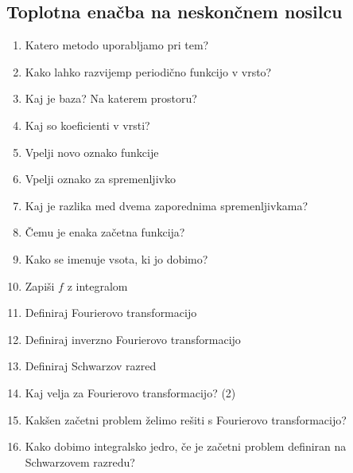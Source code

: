 \documentclass{article}
\begin{document}
    \subsection{Toplotna enačba na neskončnem nosilcu}
    \begin{enumerate}
        \item Katero metodo uporabljamo pri tem?
        \item Kako lahko razvijemp periodično funkcijo v vrsto?
        \item Kaj je baza? Na katerem prostoru?
        \item Kaj so koeficienti v vrsti?
        \item Vpelji novo oznako funkcije
        \item Vpelji oznako za spremenljivko
        \item Kaj je razlika med dvema zaporednima spremenljivkama?
        \item Čemu je enaka začetna funkcija?
        \item Kako se imenuje vsota, ki jo dobimo?
        \item Zapiši $f$ z integralom
        \item Definiraj Fourierovo transformacijo
        \item Definiraj inverzno Fourierovo transformacijo
        \item Definiraj Schwarzov razred
        \item Kaj velja za Fourierovo transformacijo? (2)
        \item Kakšen začetni problem želimo rešiti s Fourierovo transformacijo?
        \item Kako dobimo integralsko jedro, če je začetni problem definiran na Schwarzovem razredu?
    \end{enumerate}
\end{document}
